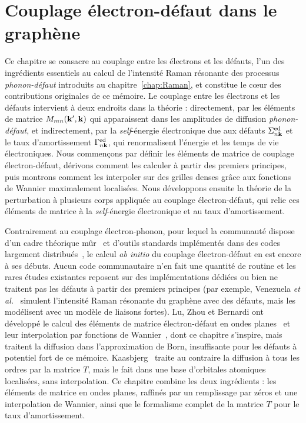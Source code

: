 \chapter{Couplage électron-défaut dans le graphène}\label{chap:défauts}
Ce chapitre se consacre au couplage entre les électrons et les défauts, l'un des ingrédients essentiels au calcul de l'intensité Raman résonante des processus \textit{phonon-défaut} introduits au chapitre~\ref{chap:Raman}, et constitue le cœur des contributions originales de ce mémoire. Le couplage entre les électrons et les défauts intervient à deux endroits dans la théorie : directement, par les éléments de matrice $M_{mn}(\mathbf{k}',\mathbf{k})$ qui apparaissent dans les amplitudes de diffusion \textit{phonon-défaut}, et indirectement, par la \textit{self}-énergie électronique due aux défauts $\Sigma_{n\mathbf{k}}^\text{ed}$ et le taux d'amortissement $\Gamma_{n\mathbf{k}}^\text{ed}$, qui renormalisent l'énergie et les temps de vie électroniques. Nous commençons par définir les éléments de matrice de couplage électron-défaut, dérivons comment les calculer à partir des premiers principes, puis montrons comment les interpoler sur des grilles denses grâce aux fonctions de Wannier maximalement localisées. Nous développons ensuite la théorie de la perturbation à plusieurs corps appliquée au couplage électron-défaut, qui relie ces éléments de matrice à la \textit{self}-énergie électronique et au taux d'amortissement.

Contrairement au couplage électron-phonon, pour lequel la communauté dispose d'un cadre théorique mûr~\cite{giustinoElectronphononInteractionsFirst2017,giustinoElectronphononInteractionUsing2007a} et d'outils standards implémentés dans des codes largement distribués~\cite{ponceEPWElectronphononCoupling2016,leeElectronPhononPhysics2023a,zhouPerturboSoftwarePackage2021,gonzeAbinitProjectImpact2020,bruninPhononlimitedElectronMobility2020}, le calcul \textit{ab initio} du couplage électron-défaut en est encore à ses débuts. Aucun code communautaire n'en fait une quantité de routine et les rares études existantes reposent sur des implémentations dédiées ou bien ne traitent pas les défauts à partir des premiers principes (par exemple, Venezuela \textit{et al.}~\cite{venezuelaTheoryDoubleresonantRaman2011} simulent l'intensité Raman résonante du graphène avec des défauts, mais les modélisent avec un modèle de liaisons fortes). Lu, Zhou et Bernardi ont développé le calcul des éléments de matrice électron-défaut en ondes planes~\cite{luEfficientInitioCalculations2019} et leur interpolation par fonctions de Wannier~\cite{luInitioElectrondefectInteractions2020}, dont ce chapitre s'inspire, mais traitent la diffusion dans l'approximation de Born, insuffisante pour les défauts à potentiel fort de ce mémoire. Kaasbjerg~\cite{kaasbjergAtomisticMatrixTheory2020} traite au contraire la diffusion à tous les ordres par la matrice $T$, mais le fait dans une base d'orbitales atomiques localisées, sans interpolation. Ce chapitre combine les deux ingrédients : les éléments de matrice en ondes planes, raffinés par un remplissage par zéros et une interpolation de Wannier, ainsi que le formalisme complet de la matrice $T$ pour le taux d'amortissement.

